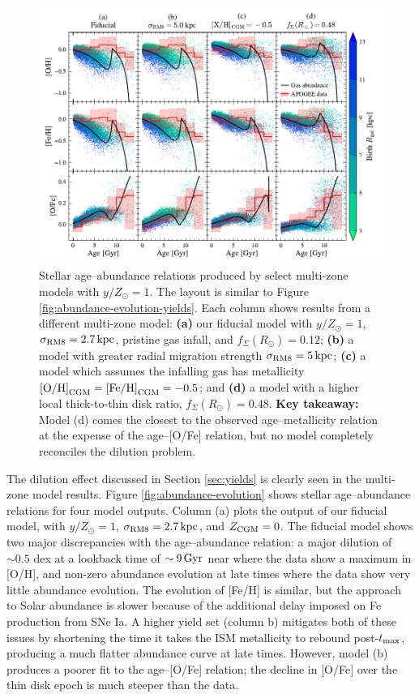 \documentclass[twocolumn,twocolappendix,linenumbers]{aastex631}
\newcommand{\mathOH}{{\rm [O/H]}}
\newcommand{\mathFeH}{{\rm [Fe/H]}}
\newcommand{\yZ}[1]{$y/Z_\odot=#1$}
\begin{document}
\begin{figure}
    \centering
    \includegraphics{figures/abundance_evolution_params.pdf}
    \caption{Stellar age--abundance relations produced by select multi-zone models with \yZ{1}. The layout is similar to Figure \ref{fig:abundance-evolution-yields}. Each column shows results from a different multi-zone model: {\bf (a)} our fiducial model with $y/Z_\odot=1$, $\sigma_{\rm RM8}=2.7\,{\rm kpc}$, pristine gas infall, and $f_\Sigma(R_\odot)=0.12$; {\bf (b)} a model with greater radial migration strength $\sigma_{\rm RM8}=5\,{\rm kpc}$; {\bf (c)} a model which assumes the infalling gas has metallicity $\mathOH_{\rm CGM}=\mathFeH_{\rm CGM}=-0.5$; and {\bf (d)} a model with a higher local thick-to-thin disk ratio, $f_\Sigma(R_\odot)=0.48$. {\bf Key takeaway:} Model (d) comes the closest to the observed age--metallicity relation at the expense of the age--[O/Fe] relation, but no model completely reconciles the dilution problem.}
    \label{fig:abundance-evolution-params}
\end{figure}

The dilution effect discussed in Section \ref{sec:yields} is clearly seen in the multi-zone model results. Figure \ref{fig:abundance-evolution} shows stellar age--abundance relations for four model outputs. Column (a) plots the output of our fiducial model, with $y/Z_\odot=1$, $\sigma_{\rm RM8}=2.7\,{\rm kpc}$, and $Z_{\rm CGM}=0$. The fiducial model shows two major discrepancies with the \citet{leung_variational_2023} age--abundance relation: a major dilution of $\sim0.5$ dex at a lookback time of $\sim9\,{\rm Gyr}$ near where the data show a maximum in [O/H], and non-zero abundance evolution at late times where the data show very little abundance evolution. The evolution of [Fe/H] is similar, but the approach to Solar abundance is slower because of the additional delay imposed on Fe production from SNe Ia. A higher yield set (column b) mitigates both of these issues by shortening the time it takes the ISM metallicity to rebound post-$t_{\rm max}$, producing a much flatter abundance curve at late times. However, model (b) produces a poorer fit to the age--[O/Fe] relation; the decline in [O/Fe] over the thin disk epoch is much steeper than the data.
\end{document}
